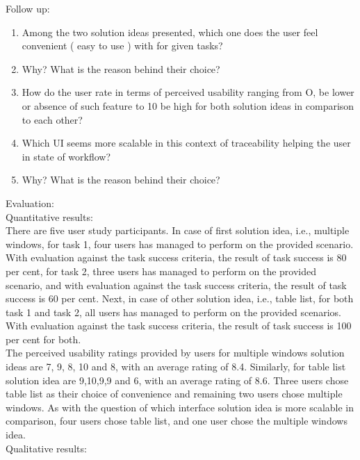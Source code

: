 Follow up: \\

\begin{enumerate}
\item Among the two solution ideas presented, which one does the user feel convenient ( easy to use ) with for given tasks?
\item Why? What is the reason behind their choice?
\item How do the user rate in terms of perceived usability ranging from O, be lower or absence of such feature to 10 be high for both solution ideas in comparison to each other?
\item Which UI seems more scalable in this context of traceability helping the user in state of workflow?
\item Why? What is the reason behind their choice?
\end{enumerate}

Evaluation: \\

Quantitative results: \\

There are five user study participants. In case of first solution idea, i.e., multiple windows, for task 1, four users has managed to perform on the provided scenario. With evaluation against the task success criteria, the result of task success is 80 per cent, for task 2, three users has managed to perform on the provided scenario, and with evaluation against the task success criteria, the result of task success is 60 per cent. Next, in case of other solution idea, i.e., table list, for both task 1 and task 2, all users has managed to perform on the provided scenarios. With evaluation against the task success criteria, the result of task success is 100 per cent for both. \\

The perceived usability ratings provided by users for multiple windows solution ideas are 7, 9, 8, 10 and 8, with an average rating of 8.4. Similarly, for table list solution idea are 9,10,9,9 and 6, with an average rating of 8.6. Three users chose table list as their choice of convenience and remaining two users chose multiple windows.
As with the question of which interface solution idea is more scalable in comparison, four users chose table list, and one user chose the multiple windows idea. \\

Qualitative results: \\

